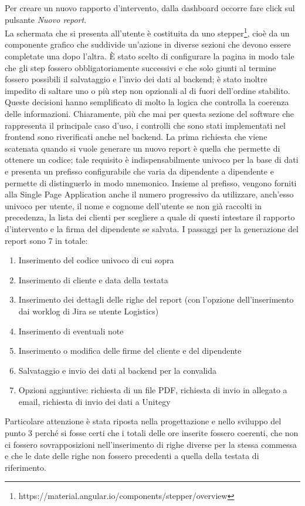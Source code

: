 Per creare un nuovo rapporto d'intervento, dalla dashboard occorre fare click sul pulsante \emph{Nuovo report}.
\\
La schermata che si presenta all'utente è costituita da uno stepper\footnote{https://material.angular.io/components/stepper/overview}, cioè da un componente grafico che suddivide
un'azione in diverse sezioni che devono essere completate una dopo l'altra.
È stato scelto di configurare la pagina in modo tale che gli step fossero obbligatoriamente successivi e che solo giunti al termine fossero possibili il salvataggio e l'invio dei dati
al backend; è stato inoltre impedito di saltare uno o più step non opzionali al di fuori dell'ordine stabilito.
Queste decisioni hanno semplificato di molto la logica che controlla la coerenza delle informazioni.
Chiaramente, più che mai per questa sezione del software che rappresenta il principale caso d'uso, i controlli che sono stati implementati nel frontend sono riverificati anche nel
backend.
La prima richiesta che viene scatenata quando si vuole generare un nuovo report è quella che permette di ottenere un codice; tale requisito è indispensabilmente univoco per la base
di dati e presenta un prefisso configurabile che varia da dipendente a dipendente e permette di distinguerlo in modo mnemonico.
Insieme al prefisso, vengono forniti alla Single Page Application anche il numero progressivo da utilizzare, anch'esso univoco per utente, il nome e cognome dell'utente se non già
raccolti in precedenza, la lista dei clienti per scegliere a quale di questi intestare il rapporto d'intervento e la firma del dipendente se salvata.
I passaggi per la generazione del report sono 7 in totale:
\begin{enumerate}
    \item Inserimento del codice univoco di cui sopra
    \item Inserimento di cliente e data della testata
    \item Inserimento dei dettagli delle righe del report (con l'opzione dell'inserimento dai worklog di Jira se utente Logistics)
    \item Inserimento di eventuali note
    \item Inserimento o modifica delle firme del cliente e del dipendente
    \item Salvataggio e invio dei dati al backend per la convalida
    \item Opzioni aggiuntive: richiesta di un file PDF, richiesta di invio in allegato a email, richiesta di invio dei dati a Unitegy
\end{enumerate}
Particolare attenzione è stata riposta nella progettazione e nello sviluppo del punto 3 perché si fosse certi che i totali delle ore inserite fossero coerenti, che non ci fossero
sovrapposizioni nell'inserimento di righe diverse per la stessa commessa e che le date delle righe non fossero precedenti a quella della testata di riferimento.


